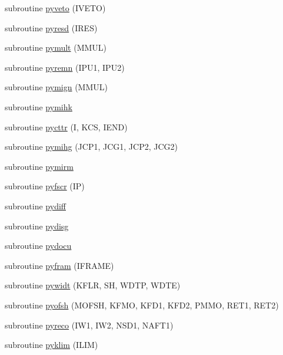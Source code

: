 \begin{DoxyCompactItemize}
\item 
subroutine \hyperlink{pythia-6_84_824_8f_ae9f324419626b48b8aec2ff1f96842b7}{pyveto} (I\+V\+E\+TO)
\item 
subroutine \hyperlink{pythia-6_84_824_8f_a420d8af4193fc0229b857f9b5c44017f}{pyresd} (I\+R\+ES)
\item 
subroutine \hyperlink{pythia-6_84_824_8f_a4ae1a9148440832c122abdaedf3555a7}{pymult} (M\+M\+UL)
\item 
subroutine \hyperlink{pythia-6_84_824_8f_aeb405fd3ad191526318cdddb7dde6f88}{pyremn} (I\+P\+U1, I\+P\+U2)
\item 
subroutine \hyperlink{pythia-6_84_824_8f_a5c7e2372fde451d6f2253ef044e01364}{pymign} (M\+M\+UL)
\item 
subroutine \hyperlink{pythia-6_84_824_8f_a380d5a67cf0b2b0e84a5dee74ad5957a}{pymihk}
\item 
subroutine \hyperlink{pythia-6_84_824_8f_a1b5177c55286abfcfa1e7668bdb4bd74}{pycttr} (I, K\+CS, I\+E\+ND)
\item 
subroutine \hyperlink{pythia-6_84_824_8f_ac8dd442c2f34ca943404bcfbe715776b}{pymihg} (J\+C\+P1, J\+C\+G1, J\+C\+P2, J\+C\+G2)
\item 
subroutine \hyperlink{pythia-6_84_824_8f_af6270eeef12969a7be55ee5423d8f478}{pymirm}
\item 
subroutine \hyperlink{pythia-6_84_824_8f_a53aee4d056754e39818570985bc7167d}{pyfscr} (IP)
\item 
subroutine \hyperlink{pythia-6_84_824_8f_a973c4594f689ccebe5ec7cac4d282a3b}{pydiff}
\item 
subroutine \hyperlink{pythia-6_84_824_8f_a0e46fc7fcb0065bf77fceb77b729a30c}{pydisg}
\item 
subroutine \hyperlink{pythia-6_84_824_8f_a9c34dd046b708bae74764d11961b1bf4}{pydocu}
\item 
subroutine \hyperlink{pythia-6_84_824_8f_a1fa4f66dad94f52bee42aa351c5af69e}{pyfram} (I\+F\+R\+A\+ME)
\item 
subroutine \hyperlink{pythia-6_84_824_8f_ad7324915c7a7d7f155890fd467a05d8e}{pywidt} (K\+F\+LR, SH, W\+D\+TP, W\+D\+TE)
\item 
subroutine \hyperlink{pythia-6_84_824_8f_a7c47045290198780dd664e84fbacf4fc}{pyofsh} (M\+O\+F\+SH, K\+F\+MO, K\+F\+D1, K\+F\+D2, P\+M\+MO, R\+E\+T1, R\+E\+T2)
\item 
subroutine \hyperlink{pythia-6_84_824_8f_a765625392f2be53cb4e630c2114d8e98}{pyreco} (I\+W1, I\+W2, N\+S\+D1, N\+A\+F\+T1)
\item 
subroutine \hyperlink{pythia-6_84_824_8f_a59cf7e6fe3565bf6a5712dae11a239ce}{pyklim} (I\+L\+IM)

\end{DoxyCompactItemize}
